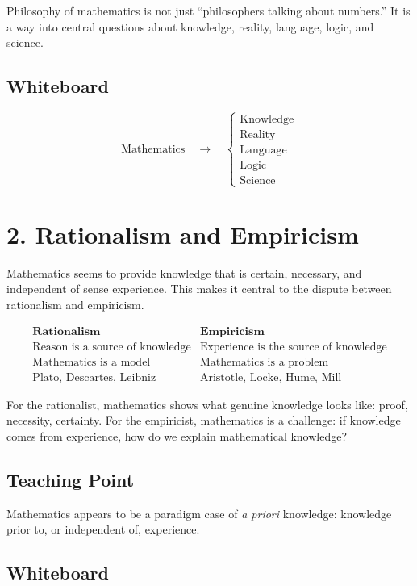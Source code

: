 \documentclass[11pt]{article}
\begin{document}
Philosophy of mathematics is not just ``philosophers talking about numbers.'' It is a way
into central questions about knowledge, reality, language, logic, and science.

\subsection*{Whiteboard}

\[
\text{Mathematics}
\quad \longrightarrow \quad
\begin{cases}
\text{Knowledge} \\
\text{Reality} \\
\text{Language} \\
\text{Logic} \\
\text{Science}
\end{cases}
\]

\section*{2. Rationalism and Empiricism}

Mathematics seems to provide knowledge that is certain, necessary, and independent of
sense experience. This makes it central to the dispute between rationalism and empiricism.

\[
\begin{array}{c|c}
\textbf{Rationalism} & \textbf{Empiricism} \\
\hline
\text{Reason is a source of knowledge} & \text{Experience is the source of knowledge} \\
\text{Mathematics is a model} & \text{Mathematics is a problem} \\
\text{Plato, Descartes, Leibniz} & \text{Aristotle, Locke, Hume, Mill}
\end{array}
\]

For the rationalist, mathematics shows what genuine knowledge looks like: proof,
necessity, certainty. For the empiricist, mathematics is a challenge: if knowledge comes
from experience, how do we explain mathematical knowledge?

\subsection*{Teaching Point}

Mathematics appears to be a paradigm case of \emph{a priori} knowledge: knowledge prior
to, or independent of, experience.

\subsection*{Whiteboard}
\end{document}
